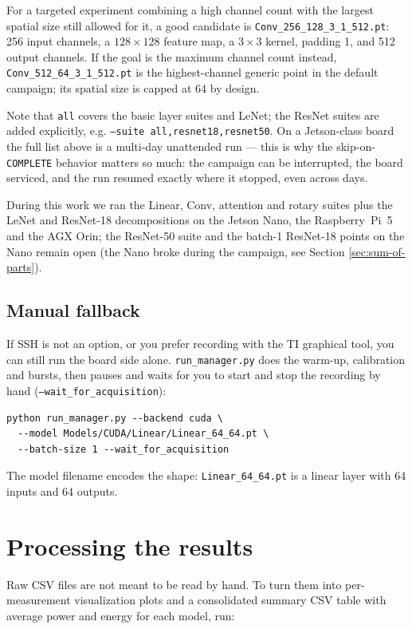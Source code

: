 For a targeted experiment combining a high channel count with the largest
spatial size still allowed for it, a good candidate is
\texttt{Conv\_256\_128\_3\_1\_512.pt}: 256 input channels, a
$128{\times}128$ feature map, a $3{\times}3$ kernel, padding 1, and 512
output channels. If the goal is the maximum channel count instead,
\texttt{Conv\_512\_64\_3\_1\_512.pt} is the highest-channel generic point
in the default campaign; its spatial size is capped at 64 by design.

Note that \texttt{all} covers the basic layer suites and LeNet; the ResNet
suites are added explicitly, e.g.
\texttt{--suite all,resnet18,resnet50}. On a Jetson-class board the full
list above is a multi-day unattended run --- this is why the
skip-on-\texttt{COMPLETE} behavior matters so much: the campaign can be
interrupted, the board serviced, and the run resumed exactly where it
stopped, even across days.

During this work we ran the Linear, Conv, attention and rotary
suites plus the LeNet and ResNet-18 decompositions on the Jetson Nano, the
Raspberry~Pi~5 and the AGX Orin; the ResNet-50 suite and the batch-1
ResNet-18 points on the Nano remain open (the Nano broke during the
campaign, see Section \ref{sec:sum-of-parts}).

\subsection{Manual fallback}

If SSH is not an option, or you prefer recording with the TI graphical tool,
you can still run the board side alone. \texttt{run\_manager.py} does the
warm-up, calibration and bursts, then pauses and waits for you to start and
stop the recording by hand (\texttt{--wait\_for\_acquisition}):

\begin{lstlisting}
python run_manager.py --backend cuda \
  --model Models/CUDA/Linear/Linear_64_64.pt \
  --batch-size 1 --wait_for_acquisition
\end{lstlisting}

The model filename encodes the shape: \texttt{Linear\_64\_64.pt} is a linear
layer with 64 inputs and 64 outputs.

\section{Processing the results}

Raw CSV files are not meant to be read by hand. To turn them into
per-measurement visualization plots and a consolidated summary CSV table with average power
and energy for each model, run:

